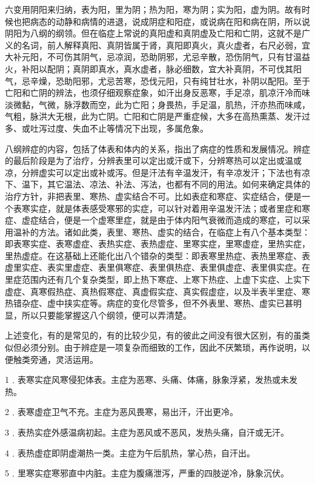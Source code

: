 \documentclass[a4paper,12pt,UTF8,twoside]{ctexbook}
\begin{document}
六变用阴阳来归纳，表为阳，里为阴；热为阳，寒为阴；实为阳，虚为阴。故有时候也把病态的动静和病情的进退，说成阴症和阳症，或说病在阳和病在阴，所以说阴阳为八纲的纲领。但在临症上常说的真阳虚和真阴虚及亡阳和亡阴，这就不是广义的名词，前人解释真阳、真阴皆属于肾，真阳即真火，真火虚者，右尺必弱，宜大补元阳，不可伤其阴气，忌凉润，恐助阴邪，尤忌辛散，恐伤阴气，只有甘温益火，补阳以配阴；真阴即真水，真水虚者，脉必细数，宜大补真阴，不可伐其阳气，忌辛燥，恐助阳邪，尤忌苦寒，恐伐元阳，只有纯甘壮水，补阴以配阳。至于亡阳和亡阴的辨法，也须仔细观察症象，如汗出身反恶寒，手足凉，肌凉汗冷而味淡微黏，气微，脉浮数而空，此为亡阳；身畏热，手足温，肌热，汗亦热而味咸，气粗，脉洪大无根，此为亡阴。亡阳和亡阴是严重症候，大多在高热熏蒸、发汗过多、或吐泻过度、失血不止等情况下出现，多属危象。

八纲辨症的内容，包括了体表和体内的关系，指出了病症的性质和发展情况。辨症的最后阶段是为了治疗，分辨表里可以定出或汗或下，分辨寒热可以定出或温或凉，分辨虚实可以定出或补或泻。但是汗法有辛温发汗，有辛凉发汗；下法也有凉下、温下，其它温法、凉法、补法、泻法，也都有不同的用法。如何来确定具体的治疗方针，非把表里、寒热、虚实结合不可。比如表症和寒症、实症结合，便是一个表寒实症，就是体表感受寒邪的实症，可以针对着用辛温发汗法；或者里症和寒症、虚症结合，便是一个虚寒里症，就是由于体内阳气衰微而造成的寒症，可以采用温补的方法。诸如此类，表里、寒热、虚实的结合，在临症上有八个基本类型：即表寒实症、表寒虚症、表热实症、表热虚症、里寒实症，里寒虚症，里热实症，里热虚症。在这基础上还能化出八个错杂的类型：即表寒里热症、表热里寒症、表虚里实症、表实里虚症、表里俱寒症、表里俱热症、表里俱虚症、表里俱实症。在里症范围内还有几个复杂类型，即上热下寒症、上寒下热症、上虚下实症、上实下虚症、真寒假热症、真热假寒症、真虚假实症、真实假虚症，以及半表半里症、寒热错杂症、虚中挟实症等。病症的变化尽管多，但不外表里、寒热、虚实已甚明显，所以只要能掌握这八个纲领，便可以弄清楚。

上述变化，有的是常见的，有的比较少见，有的彼此之间没有很大区别，有的虽类似但必须分别。由于辨症是一项复杂而细致的工作，因此不厌繁琐，再作说明，以便触类旁通，灵活运用。

1﹒表寒实症风寒侵犯体表。主症为恶寒、头痛、体痛，脉象浮紧，发热或未发热。

2﹒表寒虚症卫气不充。主症为恶风畏寒，易出汗，汗出更冷。

3﹒表热实症外感温病初起。主症为恶风或不恶风，发热头痛，自汗或无汗。

4﹒表热虚症即阴虚潮热一类。主症为午后肌热，掌心热，自汗出。

5﹒里寒实症寒邪直中内脏。主症为腹痛泄泻，严重的四肢逆冷，脉象沉伏。
\end{document}
